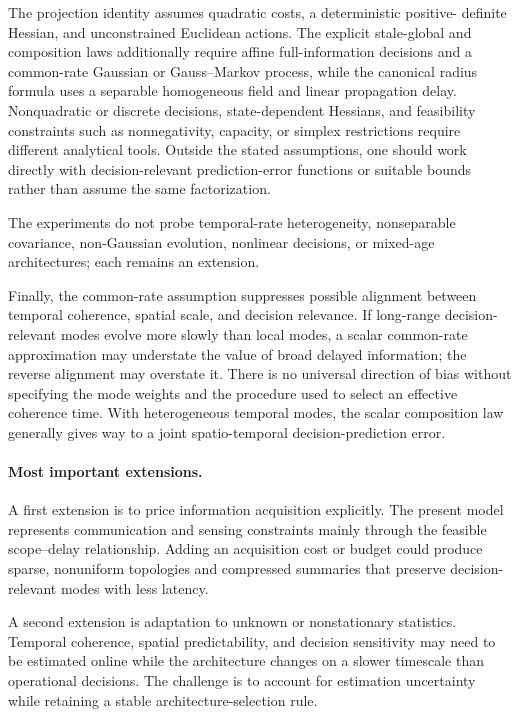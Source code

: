 \documentclass[11pt]{article}
\begin{document}
The projection identity assumes quadratic costs, a deterministic positive-
definite Hessian, and unconstrained Euclidean actions. The explicit stale-global
and composition laws additionally require affine full-information decisions
and a common-rate Gaussian or Gauss--Markov process, while the canonical radius
formula uses a separable homogeneous field and linear propagation delay.
Nonquadratic or discrete decisions, state-dependent Hessians, and feasibility
constraints such as nonnegativity, capacity, or simplex restrictions require
different analytical tools. Outside the stated assumptions, one should work
directly with decision-relevant prediction-error functions or suitable bounds
rather than assume the same factorization.

The experiments do not probe temporal-rate heterogeneity, nonseparable
covariance, non-Gaussian evolution, nonlinear decisions, or mixed-age
architectures; each remains an extension.

Finally, the common-rate assumption suppresses possible alignment between
temporal coherence, spatial scale, and decision relevance. If long-range
decision-relevant modes evolve more slowly than local modes, a scalar
common-rate approximation may understate the value of broad delayed
information; the reverse alignment may overstate it. There is no universal
direction of bias without specifying the mode weights and the procedure used
to select an effective coherence time. With heterogeneous temporal modes, the
scalar composition law generally gives way to a joint spatio-temporal
decision-prediction error.

\paragraph{Most important extensions.}
A first extension is to price information acquisition explicitly. The present
model represents communication and sensing constraints mainly through the
feasible scope--delay relationship. Adding an acquisition cost or budget could
produce sparse, nonuniform topologies and compressed summaries that preserve
decision-relevant modes with less latency.

A second extension is adaptation to unknown or nonstationary statistics.
Temporal coherence, spatial predictability, and decision sensitivity may need
to be estimated online while the architecture changes on a slower timescale
than operational decisions. The challenge is to account for estimation
uncertainty while retaining a stable architecture-selection rule.
\end{document}
